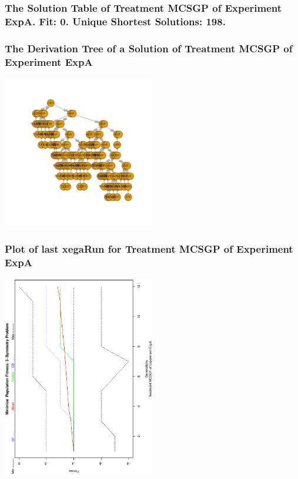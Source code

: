 \documentclass[18pt,c]{beamer}
\begin{document}
 \begin{frame}
 \fontsize{8pt}{9pt}\selectfont
 \frametitle{ The Solution Table of Treatment MCSGP of Experiment ExpA. Fit: 0. Unique Shortest Solutions: 198. }

 \label{ExpASolutionTable001.tex}  
 \end{frame}

 \begin{frame}
 \frametitle{ The Derivation Tree of a Solution of Treatment MCSGP of Experiment ExpA }
 \begin{center}
\includegraphics[width=0.5\textwidth, angle=0]
{ExpADerivationTreeFigure000.pdf}
 \end{center}
 \label{report/ExpADerivationTreeFigure000.pdf}  
 \end{frame}

 \begin{frame}
 \frametitle{ Plot of last xegaRun for Treatment MCSGP of Experiment ExpA }
 \begin{center}
\includegraphics[width=0.5\textwidth, angle=-90]
{ExpAPlotPopStatsFigure001.eps}
 \end{center}
 \label{report/ExpAPlotPopStatsFigure001.eps}  
 \end{frame}
\end{document}
